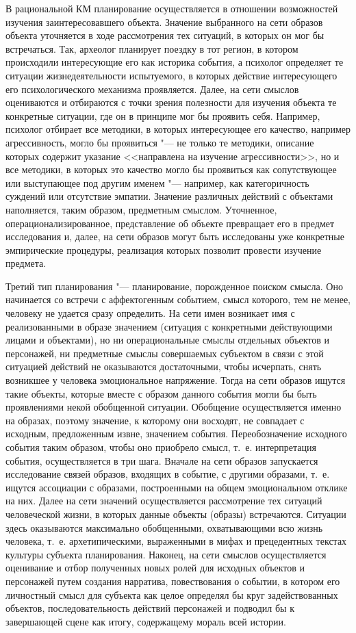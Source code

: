\documentclass[a4paper, 12pt]{article}
\numberwithin{equation}{section}
\begin{document}
	В рациональной КМ планирование осуществляется в отношении возможностей изучения заинтересовавшего объекта. Значение выбранного на сети образов объекта уточняется в ходе рассмотрения тех ситуаций, в которых он мог бы встречаться. Так, археолог планирует поездку в тот регион, в котором происходили интересующие его как историка события, а психолог определяет те ситуации жизнедеятельности испытуемого, в которых действие интересующего его психологического механизма проявляется. Далее, на сети смыслов оцениваются и отбираются с точки зрения полезности для изучения объекта те конкретные ситуации, где он в принципе мог бы проявить себя. Например, психолог отбирает все методики, в которых интересующее его качество, например агрессивность, могло бы проявиться "--- не только те методики, описание которых содержит указание <<направлена на изучение агрессивности>>, но и все методики, в которых это качество могло бы проявиться как сопутствующее или выступающее под другим именем "--- например, как категоричность суждений или отсутствие эмпатии. Значение различных действий с объектами наполняется, таким образом, предметным смыслом. Уточненное, операционализированное, представление об объекте превращает его в предмет исследования и, далее, на сети образов могут быть исследованы уже конкретные эмпирические процедуры, реализация которых позволит провести изучение предмета.
	
	Третий тип планирования "--- планирование, порожденное поиском смысла. Оно начинается со встречи с аффектогенным событием, смысл которого, тем не менее, человеку не удается сразу определить. На сети имен возникает имя с реализованными в образе значением (ситуация с конкретными действующими лицами и объектами), но ни операциональные смыслы отдельных объектов и персонажей, ни предметные смыслы совершаемых субъектом в связи с этой ситуацией действий не оказываются достаточными, чтобы исчерпать, снять возникшее у человека эмоциональное напряжение. Тогда на сети образов ищутся такие объекты, которые вместе с образом данного события могли бы быть проявлениями некой обобщенной ситуации. Обобщение осуществляется именно на образах, поэтому значение, к которому они восходят, не совпадает с исходным, предложенным извне, значением события. Переобозначение исходного события таким образом, чтобы оно приобрело смысл, т.~е. интерпретация события, осуществляется в три шага. Вначале на сети образов запускается исследование связей образов, входящих в событие, с другими образами, т.~е. ищутся ассоциации с образами, построенными на общем эмоциональном отклике на них. Далее на сети значений осуществляется рассмотрение тех ситуаций человеческой жизни, в которых данные объекты (образы) встречаются. Ситуации здесь оказываются максимально обобщенными, охватывающими всю жизнь человека, т.~е. архетипическими, выраженными в мифах и прецедентных текстах культуры субъекта планирования. Наконец, на сети смыслов осуществляется оценивание и отбор полученных новых ролей для исходных объектов и персонажей путем создания нарратива, повествования о событии, в котором его личностный смысл для субъекта как целое определял бы круг задействованных объектов, последовательность действий персонажей и подводил бы к завершающей сцене как итогу, содержащему мораль всей истории.
\end{document}
